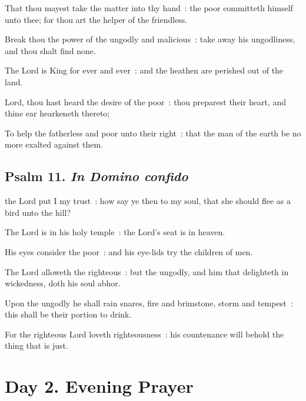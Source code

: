 That thou mayest take the matter into thy hand~: the poor committeth himself unto thee; for thou art the helper of the friendless.\par
{}Break thou the power of the ungodly and malicious~: take away his ungodliness, and thou shalt find none.\par
{}The Lord is King for ever and ever~: and the heathen are perished out of the land.\par
{}Lord, thou hast heard the desire of the poor~: thou preparest their heart, and thine ear hearkeneth thereto;\par
{}To help the fatherless and poor unto their right~: that the man of the earth be no more exalted against them.\par

\subsection{Psalm 11. \textit{In Domino confido}}


 the Lord put I my trust~: how say ye then to my soul, that she should flee as a bird unto the hill?\par
{}
The Lord is in his holy temple~: the Lord's seat is in heaven.\par
{}His eyes consider the poor~: and his eye-lids try the children of men.\par
{}The Lord alloweth the righteous~: but the ungodly, and him that delighteth in wickedness, doth his soul abhor.\par
{}Upon the ungodly he shall rain snares, fire and brimstone, storm and tempest~: this shall be their portion to drink.\par
{}For the righteous Lord loveth righteousness~: his countenance will behold the thing that is just.\par


\clearpage
\section*{Day 2. Evening Prayer}


